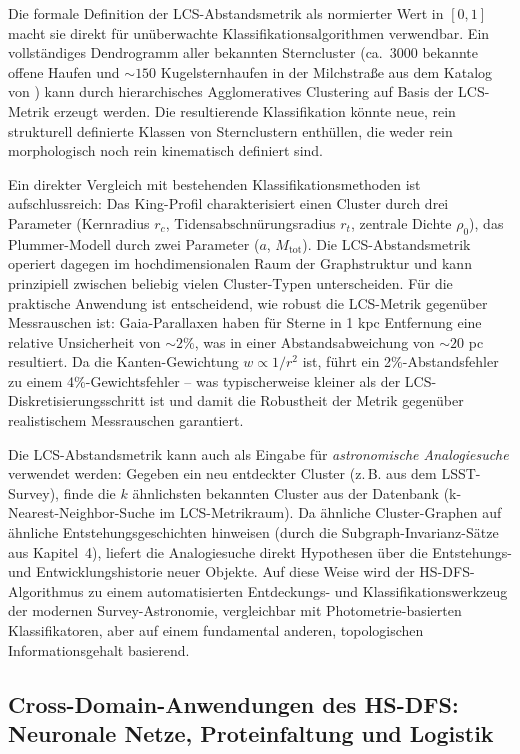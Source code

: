 ﻿\documentclass[a4paper,12pt]{report}
\theoremstyle{definition}
\begin{document}
Die formale Definition der LCS-Abstandsmetrik als normierter Wert in $[0,1]$ macht sie direkt für unüberwachte Klassifikationsalgorithmen verwendbar. Ein vollständiges Dendrogramm aller bekannten Sterncluster (ca.\ 3000 bekannte offene Haufen und $\sim 150$ Kugelsternhaufen in der Milchstraße aus dem Katalog von \cite{harris1996}) kann durch hierarchisches Agglomeratives Clustering auf Basis der LCS-Metrik erzeugt werden. Die resultierende Klassifikation könnte neue, rein strukturell definierte Klassen von Sternclustern enthüllen, die weder rein morphologisch noch rein kinematisch definiert sind.

Ein direkter Vergleich mit bestehenden Klassifikationsmethoden ist aufschlussreich: Das King-Profil charakterisiert einen Cluster durch drei Parameter (Kernradius $r_c$, Tidensabschnürungsradius $r_t$, zentrale Dichte $\rho_0$), das Plummer-Modell durch zwei Parameter ($a$, $M_\mathrm{tot}$). Die LCS-Abstandsmetrik operiert dagegen im hochdimensionalen Raum der Graphstruktur und kann prinzipiell zwischen beliebig vielen Cluster-Typen unterscheiden. Für die praktische Anwendung ist entscheidend, wie robust die LCS-Metrik gegenüber Messrauschen ist: Gaia-Parallaxen haben für Sterne in 1 kpc Entfernung eine relative Unsicherheit von $\sim 2\%$, was in einer Abstandsabweichung von $\sim 20$ pc resultiert. Da die Kanten-Gewichtung $w \propto 1/r^2$ ist, führt ein 2\%-Abstandsfehler zu einem 4\%-Gewichtsfehler -- was typischerweise kleiner als der LCS-Diskretisierungsschritt ist und damit die Robustheit der Metrik gegenüber realistischem Messrauschen garantiert.

Die LCS-Abstandsmetrik kann auch als Eingabe für \emph{astronomische Analogiesuche} verwendet werden: Gegeben ein neu entdeckter Cluster (z.\,B. aus dem LSST-Survey), finde die $k$ ähnlichsten bekannten Cluster aus der Datenbank (k-Nearest-Neighbor-Suche im LCS-Metrikraum). Da ähnliche Cluster-Graphen auf ähnliche Entstehungsgeschichten hinweisen (durch die Subgraph-Invarianz-Sätze aus Kapitel~4), liefert die Analogiesuche direkt Hypothesen über die Entstehungs- und Entwicklungshistorie neuer Objekte. Auf diese Weise wird der HS-DFS-Algorithmus zu einem automatisierten Entdeckungs- und Klassifikationswerkzeug der modernen Survey-Astronomie, vergleichbar mit Photometrie-basierten Klassifikatoren, aber auf einem fundamental anderen, topologischen Informationsgehalt basierend.

\subsection{Cross-Domain-Anwendungen des HS-DFS: Neuronale Netze, Proteinfaltung und Logistik}
\end{document}
